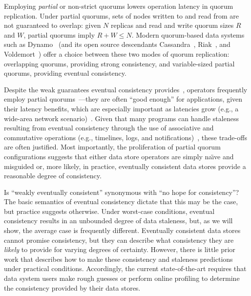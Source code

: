 \documentclass{vldb}
\begin{document}
Employing \textit{partial} or non-strict quorums lowers operation
latency in quorum replication.  Under partial quorums, sets of nodes
written to and read from are not guaranteed to overlap: given $N$
replicas and read and write quorum sizes $R$ and $W$, partial quorums
imply $R+W \leq N$.  Modern quorum-based data systems such as
Dynamo~\cite{dynamo} (and its open source descendants
Cassandra~\cite{cassandra}, Riak~\cite{riak}, and
Voldemort~\cite{voldemort}) offer a choice between these two modes of
quorum replication: overlapping quorums, providing strong consistency,
and variable-sized partial quorums, providing eventual consistency.

Despite the weak guarantees eventual
consistency provides~\cite{hamilton-cap, cops, walter}, operators frequently
employ partial quorums~\cite{cassandra, cassandra-docs,
  cassandradefault,feinbergpc,reddit, outbrain, maxperfblog}---they
are often ``good enough'' for applications, given their latency
benefits, which are especially important as latencies grow (e.g., a
wide-area network scenario)~\cite{abadilatconsist, feinbergpc}.  Given
that many programs can handle staleness resulting from eventual
consistency through the use of associative and commutative operations
(e.g., timelines, logs, and notifications)~\cite{calm, helland}, these
trade-offs are often justified.  Most importantly, the proliferation
of partial quorum configurations suggests that either data store
operators are simply na\"{\i}ve and misguided or, more likely, in
practice, eventually consistent data stores provide a reasonable
degree of consistency.

Is ``weakly eventually consistent'' synonymous with ``no hope for
consistency''? The basic semantics of eventual consistency dictate
that this may be the case, but practice suggests otherwise. Under
worst-case conditions, eventual consistency results in an unbounded
degree of data staleness, but, as we will show, the average case is
frequently different.  Eventually consistent data stores cannot
promise consistency, but they can describe what consistency they are
\textit{likely} to provide for varying degrees of certainty.  However,
there is little prior work that describes how to make these
consistency and staleness predictions under practical conditions.
Accordingly, the current state-of-the-art requires that data system
users make rough guesses or perform online profiling to determine the
consistency provided by their data stores.
\end{document}
